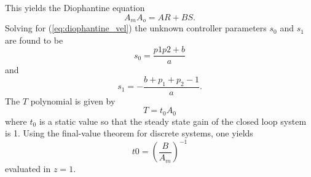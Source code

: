 \documentclass[12pt,a4paper]{article}
\begin{document}
This yields the Diophantine equation
\begin{equation}
    \label{eq:diophantine_vel}
    A_mA_o = AR + BS.
\end{equation}
Solving for (\ref{eq:diophantine_vel}) the unknown controller parameters $s_0$
and $s_1$ are found to be
\begin{equation}
    \label{eq:s0_vel}
    s_0 = \frac{p1p2+b}{a}
\end{equation}
and
\begin{equation}
    \label{eq:s1_vel}
    s_1 = -\frac{b + p_1 + p_2 -1}{a}.
\end{equation}
The $T$ polynomial is given by 
\begin{equation}
    \label{eq:T_vel}
    T = t_0A_0
\end{equation}
where $t_0$ is a static value so that the steady state gain of the closed loop
system is 1. Using the final-value theorem for discrete systems, one yields
\begin{equation}
    \label{eq:t0_vel}
    t0 = \left (\frac{B}{A_m} \right )^{-1}
\end{equation}
evaluated in $z=1$. \\
\end{document}
